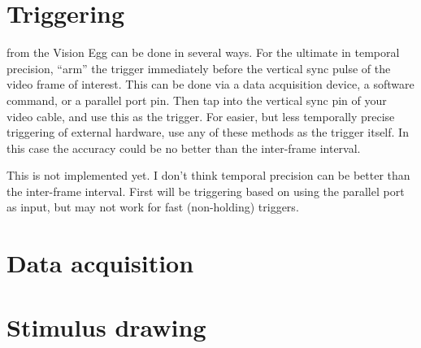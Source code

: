 \section{Triggering}

 from the Vision Egg can be done in
several ways. For the ultimate in temporal precision, ``arm'' the
trigger immediately before the vertical sync pulse of the video frame
of interest. This can be done via a data acquisition device, a
software command, or a parallel port pin. Then tap into the vertical
sync pin of your video cable, and use this as the trigger. For easier,
but less temporally precise triggering of external hardware, use any
of these methods as the trigger itself.  In this case the accuracy
could be no better than the inter-frame interval.

 This is not implemented yet. I don't
think temporal precision can be better than the inter-frame
interval. First will be triggering based on using the parallel port as
input, but may not work for fast (non-holding) triggers.

\section{Data acquisition}

\section{Stimulus drawing}
